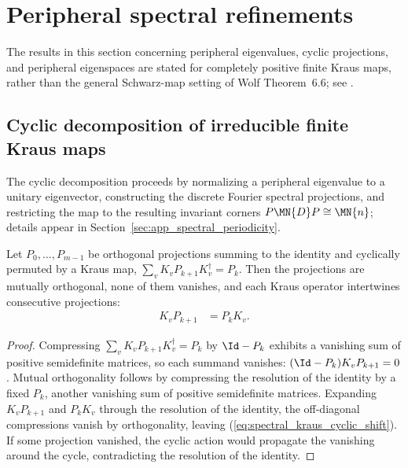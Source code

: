 \section{Peripheral spectral refinements}

The results in this section concerning peripheral eigenvalues, cyclic
projections, and peripheral eigenspaces are stated for completely positive finite
Kraus maps, rather than the general Schwarz-map setting of Wolf
Theorem~6.6; see \cite{gap:wolf_thm6_6_kraus_scope}.


\subsection{Cyclic decomposition of irreducible finite Kraus maps}

The cyclic decomposition proceeds by normalizing a peripheral eigenvalue to a
unitary eigenvector, constructing the discrete Fourier spectral projections,
and restricting the map to the resulting invariant corners
$P\MN{D}P\cong\MN{n}$; details appear in
Section~\ref{sec:app_spectral_periodicity}.


\begin{lemma}
    \label{lem:kraus_cyclic_shift}
    \leanok
    Let $P_0,\ldots,P_{m-1}$ be orthogonal projections summing to the
    identity and cyclically permuted by a Kraus map,
    $\sum_vK_vP_{k+1}K_v^\dagger=P_k$. Then the projections are mutually
    orthogonal, none of them vanishes, and each Kraus operator intertwines
    consecutive projections:
    \begin{align}
        K_vP_{k+1}
         & =P_kK_v.
        \label{eq:spectral_kraus_cyclic_shift}
    \end{align}
\end{lemma}

\begin{proof}
    \leanok

    Compressing $\sum_vK_vP_{k+1}K_v^\dagger=P_k$ by $\Id-P_k$ exhibits a
    vanishing sum of positive semidefinite matrices, so each summand
    vanishes: $(\Id-P_k)K_vP_{k+1}=0$. Mutual orthogonality follows by
    compressing the resolution of the identity by a fixed $P_k$, another
    vanishing sum of positive semidefinite matrices. Expanding
    $K_vP_{k+1}$ and $P_kK_v$ through the resolution of the identity, the
    off-diagonal compressions vanish by orthogonality, leaving
    (\ref{eq:spectral_kraus_cyclic_shift}). If some projection vanished,
    the cyclic action would propagate the vanishing around the cycle,
    contradicting the resolution of the identity.
\end{proof}


